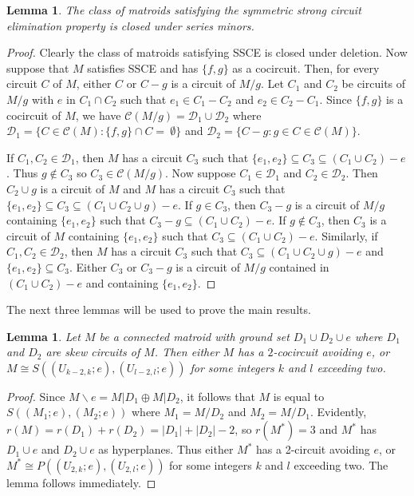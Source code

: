 \documentclass[12pt,reqno]{amsart}
\newtheorem{lemma}[theorem]{Lemma}
\theoremstyle{definition}
\theoremstyle{remark}
\numberwithin{equation}{section}
\newcommand{\del}{\backslash}
\newcommand{\C}{\mathcal{C}}
\begin{document}
\begin{lemma}\label{closed}
    The class of matroids satisfying the symmetric strong circuit elimination property is closed under series minors.  
\end{lemma}
    \begin{proof}
       Clearly the class of matroids satisfying SSCE is closed under deletion. 
       Now suppose that $M$ satisfies SSCE and has $\{f,g\}$ as a cocircuit. 
       Then, for every circuit $C$ of $M$, either $C$ or $C-g$ is a circuit of $M/g$.  
       Let $C_1$ and $C_2$ be circuits of $M/g$ with $e$ in $C_1\cap C_2$ such that $e_1\in C_1-C_2$ and $e_2\in C_2-C_1$. 
       Since $\{f,g\}$ is a cocircuit of $M$, we have $\C(M/g)=\mathcal{D}_1\cup \mathcal{D}_2$ where 
       $\mathcal{D}_1=\{C\in \C(M):\{f,g\}\cap C=~\emptyset\}$ and $\mathcal{D}_2=\{C-g: g\in C\in \C(M)\}. $

       If $C_1,C_2\in \mathcal{D}_1$, then $M$ has a circuit $C_3$ such that $\{e_1,e_2\}\subseteq C_3\subseteq (C_1\cup C_2)-e$.
       Thus $g\not\in C_3$ so $C_3\in \C(M/g)$.
       Now suppose $C_1 \in \mathcal{D}_1$ and $C_2\in \mathcal{D}_2$. 
       Then $C_2\cup g$ is a circuit of $M$ and $M$ has a circuit $C_3$ such that $\{e_1,e_2\}\subseteq C_3\subseteq (C_1\cup C_2\cup g)-e.$
       If $g\in C_3$, then $C_3-g$ is a circuit of $M/g$ containing $\{e_1,e_2\}$ such that $C_3-g\subseteq (C_1\cup C_2)-e$.  
       If $g\not\in C_3$, then $C_3$ is a circuit of $M$ containing $\{e_1,e_2\}$ such that $C_3\subseteq (C_1\cup C_2)-e$.
       Similarly, if $C_1,C_2\in \mathcal{D}_2$, then $M$ has a circuit $C_3$ such that $C_3\subseteq (C_1\cup C_2\cup g)-e$ and $\{e_1,e_2\}\subseteq C_3$. 
       Either $C_3$ or $C_3-g$ is a circuit of $M/g$ contained in $(C_1\cup C_2)-e$ and containing $\{e_1,e_2\}$. 
    \end{proof}

The next three lemmas will be used to prove the main results. 
\begin{lemma}\label{new}
   Let $M$ be a connected matroid with ground set $D_1\cup D_2\cup e$ where $D_1$ and $D_2$ are skew circuits of $M$. Then either $M$ has a $2$-cocircuit avoiding $e$, or $M\cong S((U_{k-2,k};e),(U_{l-2,l};e))$ for some integers $k$ and $l$ exceeding two. 
\end{lemma}
\begin{proof}
    Since $M\del e= M| D_1\oplus M|D_2$, it follows that $M$ is equal to $S((M_1;e),(M_2;e))$ where $M_1=M/D_2$ and $M_2=M/D_1$.
    Evidently, $r(M)=r(D_1)+r(D_2)=|D_1|+|D_2|-2$, so $r(M^*)=3$ and $M^*$ has $D_1\cup e$ and $D_2\cup e$ as hyperplanes.
    Thus either $M^*$ has a 2-circuit avoiding $e$, or $M^*\cong P((U_{2,k};e),(U_{2,l};e))$ for some integers $k$ and $l$ exceeding two. 
    The lemma follows immediately. 
\end{proof}
\end{document}

